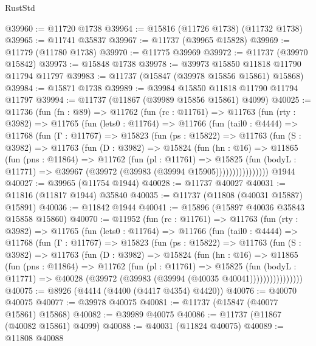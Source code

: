 \begin{lexlean}{RustStd}
\begin{coremodule}
@39960 := @11720 @1738
@39964 := @15816 (@11726 @1738) (@11732 @1738)
@39965 := @11741 @35837
@39967 := @11737 (@39965 @15828)
@39969 := @11779 (@11780 @1738)
@39970 := @11775 @39969
@39972 := @11737 (@39970 @15842)
@39973 := @15848 @1738
@39978 := @39973 @15850 @11818 @11790 @11794 @11797
@39983 := @11737 (@15847 (@39978 @15856 @15861) @15868)
@39984 := @15871 @1738
@39989 := @39984 @15850 @11818 @11790 @11794 @11797
@39994 := @11737 (@11867 (@39989 @15856 @15861) @4099)
@40025 := @11736
    (fun (fn : @89) =>
    @11762
      (fun (rc : @11761) =>
      @11763
        (fun (rty : @3982) =>
        @11765
          (fun (lets0 : @11764) =>
          @11766
            (fun (tail0 : @4444) =>
            @11768
              (fun (Γ : @11767) =>
              @15823
                (fun (ps : @15822) =>
                @11763
                  (fun (S : @3982) =>
                  @11763
                    (fun (D : @3982) =>
                    @15824
                      (fun (hn : @16) =>
                      @11865
                        (fun (pns : @11864) =>
                        @11762
                          (fun (pl : @11761) =>
                          @15825
                            (fun (bodyL : @11771) =>
                            @39967 (@39972 (@39983 (@39994 @15905))))))))))))))))
    @1944
@40027 := @39965 (@11754 @1944)
@40028 := @11737 @40027
@40031 := @11816 (@11817 @1944) @35840
@40035 := @11737 (@11808 (@40031 @15887) @15891)
@40036 := @11842 @1944
@40041 := @15896 (@15897 @40036 @35843 @15858 @15860)
@40070 := @11952
    (fun (rc : @11761) =>
    @11763
      (fun (rty : @3982) =>
      @11765
        (fun (lets0 : @11764) =>
        @11766
          (fun (tail0 : @4444) =>
          @11768
            (fun (Γ : @11767) =>
            @15823
              (fun (ps : @15822) =>
              @11763
                (fun (S : @3982) =>
                @11763
                  (fun (D : @3982) =>
                  @15824
                    (fun (hn : @16) =>
                    @11865
                      (fun (pns : @11864) =>
                      @11762
                        (fun (pl : @11761) =>
                        @15825
                          (fun (bodyL : @11771) =>
                          @40028 (@39972 (@39983 (@39994 (@40035 @40041))))))))))))))))
@40075 := @8926 (@4414 (@4400 (@4417 @4354) @4420))
@40076 := @40070 @40075
@40077 := @39978 @40075
@40081 := @11737 (@15847 (@40077 @15861) @15868)
@40082 := @39989 @40075
@40086 := @11737 (@11867 (@40082 @15861) @4099)
@40088 := @40031 (@11824 @40075)
@40089 := @11808 @40088

\end{coremodule}
\end{lexlean}
